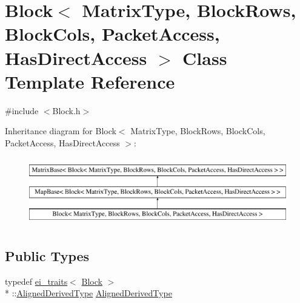 \hypertarget{class_block_3_01_matrix_type_00_01_block_rows_00_01_block_cols_00_01_packet_access_00_01_has_direct_access_01_4}{\section{Block$<$ Matrix\-Type, Block\-Rows, Block\-Cols, Packet\-Access, Has\-Direct\-Access $>$ Class Template Reference}
\label{class_block_3_01_matrix_type_00_01_block_rows_00_01_block_cols_00_01_packet_access_00_01_has_direct_access_01_4}
}


{\ttfamily \#include $<$Block.\-h$>$}

Inheritance diagram for Block$<$ Matrix\-Type, Block\-Rows, Block\-Cols, Packet\-Access, Has\-Direct\-Access $>$\-:\begin{figure}[H]
\begin{center}
\leavevmode
\includegraphics[height=3.000000cm]{class_block_3_01_matrix_type_00_01_block_rows_00_01_block_cols_00_01_packet_access_00_01_has_direct_access_01_4}
\end{center}
\end{figure}
\subsection*{Public Types}
\begin{DoxyCompactItemize}
\item 
typedef \hyperlink{structei__traits}{ei\-\_\-traits}$<$ \hyperlink{class_block}{Block} $>$\\*
\-::\hyperlink{class_block_3_01_matrix_type_00_01_block_rows_00_01_block_cols_00_01_packet_access_00_01_has_direct_access_01_4_ab969a64c6878b5d4ecfae626e7e2e8d2}{Aligned\-Derived\-Type} \hyperlink{class_block_3_01_matrix_type_00_01_block_rows_00_01_block_cols_00_01_packet_access_00_01_has_direct_access_01_4_ab969a64c6878b5d4ecfae626e7e2e8d2}{Aligned\-Derived\-Type}
\end{DoxyCompactItemize}

